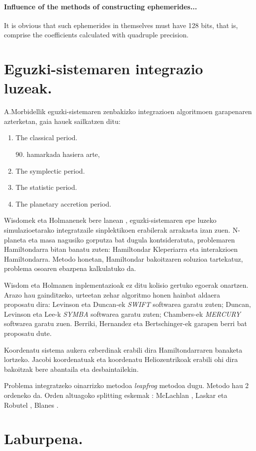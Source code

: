 \paragraph{Influence of the methods of constructing ephemerides...}
It is obvious that such ephemerides in themselves must have 128 bits, that is, comprise the coefficients calculated with quadruple precision.


\section{Eguzki-sistemaren integrazio luzeak.}

A.Morbidellik \cite{Morbidelli2002} eguzki-sistemaren zenbakizko integrazioen algoritmoen garapenaren azterketan, gaia hauek sailkatzen ditu:

\begin{enumerate}

\item The classical period.

$90$. hamarkada hasiera arte,  

\item The symplectic period.

\item The statistic period.

\item The planetary accretion period. 

\end{enumerate}


Wisdomek eta Holmanenek bere lanean ,  eguzki-sistemaren epe luzeko simulazioetarako integratzaile  sinplektikoen erabilerak arrakasta izan zuen. N-planeta eta masa nagusiko gorputza bat dugula kontsideratuta, problemaren Hamiltondarra bitan banatu zuten:  Hamiltondar Kleperiarra eta interakzioen Hamiltondarra. Metodo honetan, Hamiltondar bakoitzaren soluzioa tartekatuz, problema osoaren ebazpena kalkulatuko da. 

Wisdom eta Holmanen inplementazioak ez ditu kolisio gertuko egoerak onartzen. Arazo hau gainditzeko, urteetan zehar algoritmo honen hainbat aldaera proposatu dira: Levinson eta Duncan-ek   \emph{SWIFT} softwarea garatu zuten;  Duncan, Levinson eta Lee-k  \emph{SYMBA} softwarea garatu zuten; Chambers-ek \cite{Chambers1999} \emph{MERCURY} softwarea garatu zuen. Berriki, Hernandez eta Bertschinger-ek  garapen berri bat proposatu dute.

Koordenatu sistema aukera ezberdinak erabili dira Hamiltondarraren banaketa lortzeko. Jacobi koordenatuak eta koordenatu Heliozentrikoak erabili ohi dira bakoitzak bere abantaila eta desbaintailekin.

Problema integratzeko oinarrizko metodoa \emph{leapfrog} metodoa dugu. Metodo hau 2 ordeneko da. Orden altuagoko splitting eskemak : McLachlan , Laskar eta Robutel \cite[2001]{Laskar2001}, Blanes \cite{Blanes2013}.

\section{Laburpena.}   
       
